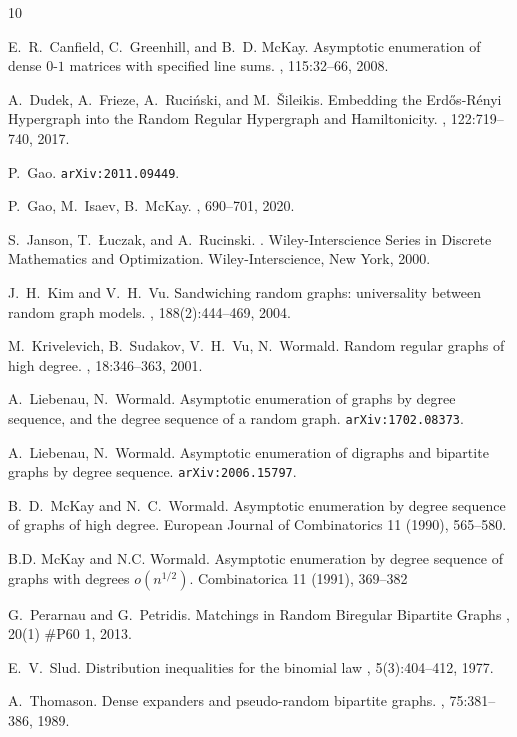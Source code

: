 \documentclass[12pt,reqno]{amsart}
\theoremstyle{definition}
\begin{document}

\begin{thebibliography}{10}
		
E.~R.~Canfield, C.~Greenhill, and B.~D. McKay.
\newblock Asymptotic enumeration of dense {$0$}-{$1$} matrices with specified line sums.
, 115:32--66,  2008.

A.~Dudek, A.~Frieze, A.~Ruci\'nski, and M.~\v{S}ileikis.
\newblock Embedding the Erd\H{o}s-R\'enyi Hypergraph into the Random Regular Hypergraph and Hamiltonicity.
, 122:719--740, 2017.

P.~Gao.
  \newblock \texttt{arXiv:2011.09449}.

P.~Gao, M.~Isaev, B.~McKay.
, 690--701, 2020.

S.~Janson, T.~{\L}uczak, and A.~Rucinski.
.
\newblock Wiley-Interscience Series in Discrete Mathematics and Optimization.
  Wiley-Interscience, New York, 2000.

J.~H.~Kim and V.~H.~Vu.
\newblock Sandwiching random graphs: universality between random graph models.
, 188(2):444--469, 2004.

  M.~Krivelevich, B.~Sudakov, V.~H.~Vu, N.~Wormald.
  \newblock Random regular graphs of high degree.
  , 18:346--363,  2001.

  A.~Liebenau, N.~Wormald.
 \newblock  Asymptotic enumeration of graphs by degree sequence, and the degree sequence of a random graph.
  \newblock \texttt{arXiv:1702.08373}.

  A.~Liebenau, N.~Wormald.
 \newblock  Asymptotic enumeration of digraphs and bipartite graphs by degree
  sequence.
  \newblock \texttt{arXiv:2006.15797}.

   B.~D.~McKay  and N.~C.~Wormald.
 \newblock Asymptotic  enumeration  by degree  sequence  of  graphs of high degree.
 \newblock European Journal of Combinatorics 11 (1990), 565--580.

  B.D. McKay and N.C. Wormald.
 \newblock Asymptotic enumeration by degree sequence of graphs with degrees $o(n^{1/2})$.
 \newblock Combinatorica 11 (1991), 369--382


	G.~Perarnau and G.~Petridis.
\newblock Matchings in Random Biregular Bipartite Graphs
, 20(1) \#P60 1, 2013.

	E.~V.~Slud.
	\newblock Distribution inequalities for the binomial law
	, 5(3):404--412, 1977.

A.~Thomason.
\newblock Dense expanders and pseudo-random bipartite graphs.
, 75:381--386, 1989.
\end{thebibliography}
\end{document}
